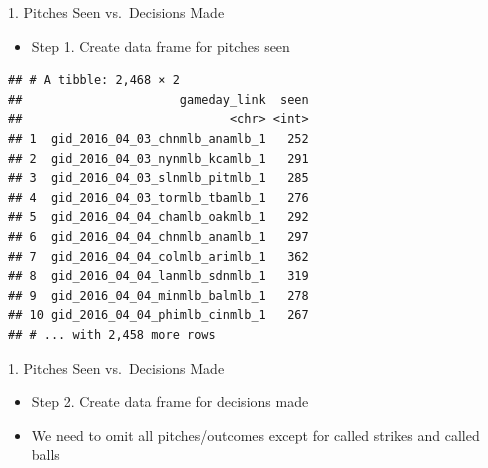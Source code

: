 \begin{frame}[fragile]{1. Pitches Seen vs.~Decisions Made}

\begin{itemize}
\tightlist
\item
  Step 1. Create data frame for pitches seen
\end{itemize}

\footnotesize

\begin{Shaded}
\end{Shaded}

\begin{verbatim}
## # A tibble: 2,468 × 2
##                      gameday_link  seen
##                             <chr> <int>
## 1  gid_2016_04_03_chnmlb_anamlb_1   252
## 2  gid_2016_04_03_nynmlb_kcamlb_1   291
## 3  gid_2016_04_03_slnmlb_pitmlb_1   285
## 4  gid_2016_04_03_tormlb_tbamlb_1   276
## 5  gid_2016_04_04_chamlb_oakmlb_1   292
## 6  gid_2016_04_04_chnmlb_anamlb_1   297
## 7  gid_2016_04_04_colmlb_arimlb_1   362
## 8  gid_2016_04_04_lanmlb_sdnmlb_1   319
## 9  gid_2016_04_04_minmlb_balmlb_1   278
## 10 gid_2016_04_04_phimlb_cinmlb_1   267
## # ... with 2,458 more rows
\end{verbatim}

\end{frame}

\begin{frame}[fragile]{1. Pitches Seen vs.~Decisions Made}

\begin{itemize}
\tightlist
\item
  Step 2. Create data frame for decisions made
\item
  We need to omit all pitches/outcomes except for called strikes and
  called balls
\end{itemize}

\footnotesize

\begin{Shaded}
\end{Shaded}

\end{frame}

